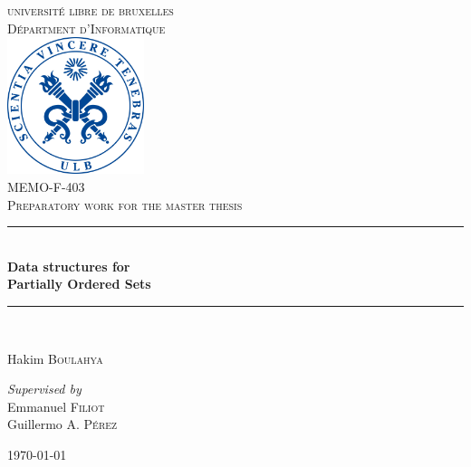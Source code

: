 \documentclass[11pt,a4paper]{article}
\theoremstyle{definition}
\newcommand{\HRule}{\rule{\linewidth}{0.2mm}} %
\begin{document}
\begin{titlepage}

\begin{center}


\textsc{\LARGE universit\'e libre de bruxelles}\\[1.0cm]
\textsc{\Large D\'epartment d'Informatique}\\[1.0cm]

\includegraphics[width=0.3\textwidth]{images/ulblogo.jpg}~\\[1cm]

\textsc{
\large MEMO-F-403 \\
\Large  Preparatory work for the master thesis
 \\[1.0cm]}
\HRule \\[0.3cm]

{ \huge \bfseries Data structures for \\
Partially Ordered Sets \\[0.3cm] }

\HRule \\[1cm]

\noindent
\begin{center} \large

\Large Hakim \textsc{Boulahya}\\
\end{center}
\begin{center} \large

\emph{Supervised by} \\
\Large Emmanuel \textsc{Filiot} \\
\Large Guillermo A. \textsc{Pérez} \\[1cm]

\end{center}

{\large \today}

\end{center}
\end{titlepage}
\end{document}
